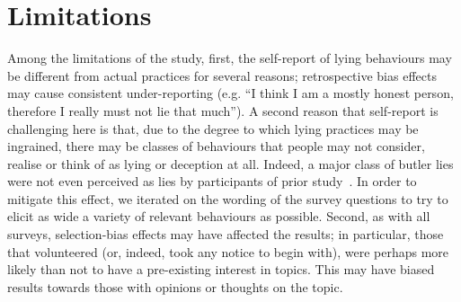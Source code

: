 \documentclass{sig-alternate}
\newcommand{\todo}[1]{\textbf{\color{red}TODO: #1}}
\newcommand{\example}[2]{%

\vspace{0.10cm}

\hspace{-3.9ex} \begin{tabular}{ p{0.6cm} p{7.15cm} }
    {\it \small (R#1)} & #2 \\
\end{tabular}%
\vspace{0.10cm}

}
\begin{document}












                 
\section{Limitations}

Among the limitations of the study, first, the self-report of lying behaviours may be different from actual practices for several reasons; retrospective bias effects may cause consistent under-reporting (e.g. ``I think I am a mostly honest person, therefore I really must not lie that much'').   A second reason that self-report is challenging here is that, due to the degree to which lying practices may be ingrained, there may be classes of behaviours that people may not consider, realise or think of as lying or deception at all.  Indeed, a major class of butler lies were not even perceived as lies by participants of prior study~\cite{hancock2009butler}.  In order to mitigate this effect, we iterated on the wording of the survey questions to try to elicit as wide a variety of relevant behaviours as possible. Second, as with all surveys, selection-bias effects may have affected the results; in particular, those that volunteered (or, indeed, took any notice to begin with), were perhaps more likely than not to have a pre-existing interest in topics.  This may have biased results towards those with opinions or thoughts on the topic.  
\end{document}

